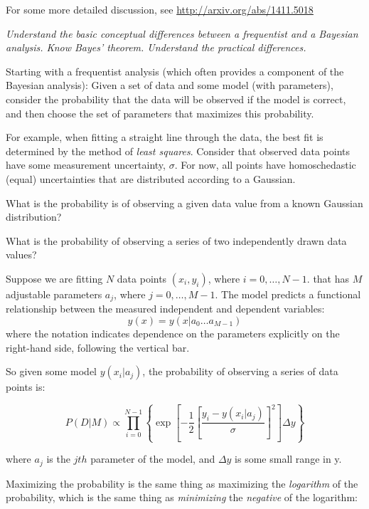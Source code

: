 \documentclass[12pt]{article}
\begin{document}
For some more detailed discussion, see
\url{http://arxiv.org/abs/1411.5018}

\colorbox{hl}{\parbox{0.9\textwidth}
{\emph{Understand the basic conceptual differences between a frequentist
        and a Bayesian analysis. Know Bayes' theorem. Understand the practical
       differences.}}}

Starting with a frequentist analysis (which often provides a component of the
Bayesian analysis): Given a set of data and some model (with parameters),
consider the probability that the data will be observed if the model is correct,
and then choose the set of parameters that maximizes this probability.

For example, when fitting a straight line through the data, the best fit is
determined by the method of \emph{least squares}.
Consider that observed data points have some measurement uncertainty,
$\sigma$. For now, all points have homoschedastic (equal) uncertainties
that are distributed according to a Gaussian.
\begin{enumerate*}
    \item What is the probability is of observing a given data value from a known
        Gaussian distribution?
    \item What is the probability of observing a series of two
        independently drawn data values?
\end{enumerate*}


Suppose we are fitting $N$ data points $(x_i,y_i)$, where $i=0,\ldots,N-1$.
that has $M$ adjustable parameters $a_j$, where $j=0,\ldots,M-1$.
The model predicts a functional relationship between the measured
independent and dependent variables:
$$ y(x) = y(x|a_0 \ldots a_{M-1}) $$
where the notation indicates dependence on the parameters explicitly on the
right-hand side, following the vertical bar.

So given some model $y(x_i|a_j)$, the probability of observing a
series of data points is:

$$    P(D|M) \propto \prod^{N-1}_{i=0}\left\{\exp
    \left[-\frac{1}{2}\left[\frac{y_i-y(x_i|a_j)}
{\sigma}\right]^2\right]\Delta y \right\} $$

where $a_j$ is the $jth$ parameter of the model, and $\Delta y$ is some small
range in y.

Maximizing the probability is the same thing as
maximizing the \emph{logarithm} of the probability, which is the same thing as
\emph{minimizing} the \emph{negative} of the logarithm:
\end{document}
